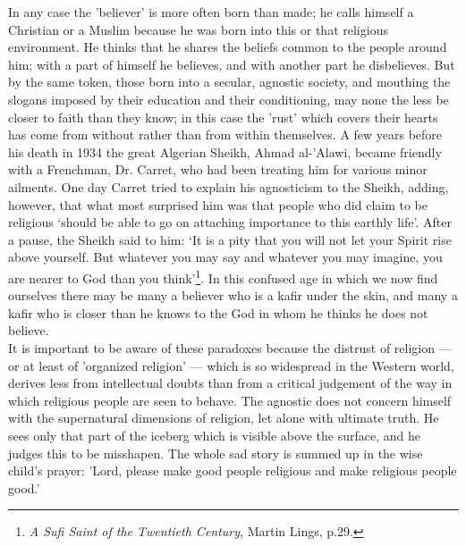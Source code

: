 \documentclass[10pt, twoside,openright]{book}
\begin{document}
In any case the 'believer' is more often born than made; he calls himself a Christian or a Muslim 
because he was born into this or that religious environment. He thinks that he shares the beliefs 
common to the people around him; with a part of himself he believes, and with another part he 
disbelieves. But by the same token, those born into a secular, agnostic society, and mouthing the 
slogans imposed by their education and their conditioning, may none the less be closer to faith than 
they know; in this case the 'rust' which covers their hearts has come from without rather than from 
within themselves. A few years before his death in 1934 the great Algerian Sheikh, Ahmad al\hyp{}'Alawi, 
became friendly with a Frenchman, Dr. Carret, who had been treating him for various minor ailments. 
One day Carret tried to explain his agnosticism to the Sheikh, adding, however, that what most 
surprised him was that people who did claim to be religious `should be able to go on attaching 
importance to this earthly life'. After a pause, the Sheikh said to him: `It is a pity that you will 
not let your Spirit rise above yourself. But whatever you may say and whatever you may imagine, you 
are nearer to God than you think'\footnote{\emph{A Sufi Saint of the Twentieth Century}, Martin Lings, p.29.}. In this confused age in which we now find ourselves there may be many a believer who is a kafir under the skin, and many a kafir who is closer than he knows to the God in whom he thinks he does not believe. \\

It is important to be aware of these paradoxes because the distrust of religion --- or at least of 
'organized religion' --- which is so widespread in the Western world, derives less from intellectual 
doubts than from a critical judgement of the way in which religious people are seen to behave. The 
agnostic does not concern himself with the supernatural dimensions of religion, let alone with 
ultimate truth. He sees only that part of the iceberg which is visible above the surface, and he 
judges this to be misshapen. The whole sad story is summed up in the wise child's prayer: 'Lord, 
please make good people religious and make religious people good.' \\
\end{document}
